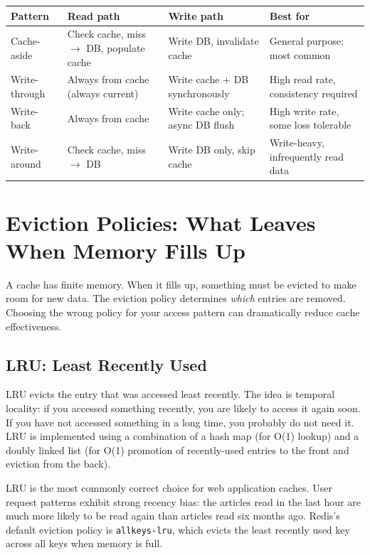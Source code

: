 \documentclass[11pt,a4paper]{article}
\begin{document}
\begin{tabularx}{\linewidth}{lXXX}
\toprule
\textbf{Pattern} & \textbf{Read path} & \textbf{Write path} & \textbf{Best for} \\
\midrule
Cache-aside & Check cache, miss $\to$ DB, populate cache & Write DB, invalidate cache & General purpose; most common \\
Write-through & Always from cache (always current) & Write cache + DB synchronously & High read rate, consistency required \\
Write-back & Always from cache & Write cache only; async DB flush & High write rate, some loss tolerable \\
Write-around & Check cache, miss $\to$ DB & Write DB only, skip cache & Write-heavy, infrequently read data \\
\bottomrule
\end{tabularx}

\section{Eviction Policies: What Leaves When Memory Fills Up}

A cache has finite memory. When it fills up, something must be evicted to make room for new data. The eviction policy determines \emph{which} entries are removed. Choosing the wrong policy for your access pattern can dramatically reduce cache effectiveness.

\subsection{LRU: Least Recently Used}

LRU evicts the entry that was accessed least recently. The idea is temporal locality: if you accessed something recently, you are likely to access it again soon. If you have not accessed something in a long time, you probably do not need it. LRU is implemented using a combination of a hash map (for O(1) lookup) and a doubly linked list (for O(1) promotion of recently-used entries to the front and eviction from the back).

LRU is the most commonly correct choice for web application caches. User request patterns exhibit strong recency bias: the articles read in the last hour are much more likely to be read again than articles read six months ago. Redis's default eviction policy is \texttt{allkeys-lru}, which evicts the least recently used key across all keys when memory is full.
\end{document}
